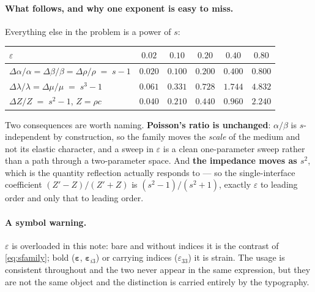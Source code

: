 \documentclass[11pt,a4paper]{article}
\begin{document}
\paragraph{What follows, and why one exponent is easy to miss.}  Everything else
in the problem is a power of $s$:

\begin{center}
\begin{tabular}{@{}lccccc@{}}
\toprule
$\varepsilon$ & $0.02$ & $0.10$ & $0.20$ & $0.40$ & $0.80$\\
\midrule
$\Delta\alpha/\alpha=\Delta\beta/\beta=\Delta\rho/\rho \;=\; s-1$
  & $0.020$ & $0.100$ & $0.200$ & $0.400$ & $0.800$\\
$\Delta\lambda/\lambda=\Delta\mu/\mu \;=\; s^{3}-1$
  & $0.061$ & $0.331$ & $0.728$ & $1.744$ & $\mathbf{4.832}$\\
$\Delta Z/Z \;=\; s^{2}-1$, \quad $Z=\rho c$
  & $0.040$ & $0.210$ & $0.440$ & $0.960$ & $2.240$\\
\bottomrule
\end{tabular}
\end{center}

\noindent
Two consequences are worth naming.  \textbf{Poisson's ratio is unchanged}:
$\alpha/\beta$ is $s$-independent by construction, so the family moves the
\emph{scale} of the medium and not its elastic character, and a sweep in
$\varepsilon$ is a clean one-parameter sweep rather than a path through a
two-parameter space.  And \textbf{the impedance moves as $s^{2}$}, which is the
quantity reflection actually responds to --- so the single-interface coefficient
$(Z'-Z)/(Z'+Z)$ is $(s^{2}-1)/(s^{2}+1)$, exactly $\varepsilon$ to leading order
and only that to leading order.

\paragraph{A symbol warning.}  $\varepsilon$ is overloaded in this note: bare and
without indices it is the contrast of \eqref{eq:sfamily}; bold
($\boldsymbol\varepsilon$, $\boldsymbol\varepsilon_{i3}$) or carrying indices
($\varepsilon_{33}$) it is strain.  The usage is consistent throughout and the
two never appear in the same expression, but they are not the same object and
the distinction is carried entirely by the typography.
\end{document}
